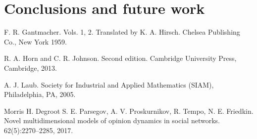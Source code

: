 \documentclass[leqno,12pt]{amsart}
\theoremstyle{remark}
\theoremstyle{remark}
\theoremstyle{remark}
\theoremstyle{definition}
\numberwithin{equation}{section}
\begin{document}
\section{Conclusions and future work}




\begin{thebibliography}{111}

    F. R. Gantmacher.
     Vols. 1, 2. Translated by K. A. Hirsch. Chelsea Publishing Co., New York 1959.
    
    R. A. Horn and C. R. Johnson.
    \newblock Second edition. Cambridge University Press, Cambridge, 2013.
    
    A. J. Laub.
     \newblock Society for Industrial and Applied Mathematics (SIAM), Philadelphia, PA, 2005.
    
     Morris H. Degroot 
    S. E. Parsegov, A. V. Proskurnikov, R. Tempo, N. E. Friedkin. \newblock Novel multidimensional models of opinion dynamics in social networks.
     62(5):2270--2285, 2017.
    
    \end{thebibliography}
\end{document}
